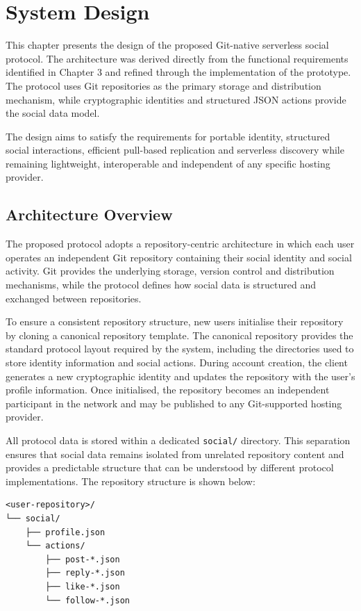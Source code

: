 \section{System Design}\label{chap:system-design} This chapter presents the design of the proposed Git-native serverless social protocol. The architecture was derived directly from the functional requirements identified in Chapter 3 and refined through the implementation of the prototype. The protocol uses Git repositories as the primary storage and distribution mechanism, while cryptographic identities and structured JSON actions provide the social data model.

The design aims to satisfy the requirements for portable identity, structured social interactions, efficient pull-based replication and serverless discovery while remaining lightweight, interoperable and independent of any specific hosting provider. 
\subsection{Architecture Overview} The proposed protocol adopts a repository-centric architecture in which each user operates an independent Git repository containing their social identity and social activity. Git provides the underlying storage, version control and distribution mechanisms, while the protocol defines how social data is structured and exchanged between repositories. 

To ensure a consistent repository structure, new users initialise their repository by cloning a canonical repository template. The canonical repository provides the standard protocol layout required by the system, including the directories used to store identity information and social actions. During account creation, the client generates a new cryptographic identity and updates the repository with the user's profile information. Once initialised, the repository becomes an independent participant in the network and may be published to any Git-supported hosting provider. 

All protocol data is stored within a dedicated \texttt{social/} directory. This separation ensures that social data remains isolated from unrelated repository content and provides a predictable structure that can be understood by different protocol implementations. The repository structure is shown below: 
\begin{verbatim} 
<user-repository>/ 
└── social/ 
    ├── profile.json 
    └── actions/ 
        ├── post-*.json 
        ├── reply-*.json 
        ├── like-*.json 
        └── follow-*.json 
\end{verbatim} 

